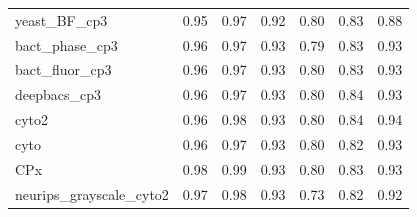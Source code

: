 \documentclass[./dissertation.tex]{subfiles}
\begin{document}
\begin{table}[htbp]
\begin{tabular}{|l|c|c|c|c|c|c|}
        yeast\_BF\_cp3            & 0.95                                    & 0.97                                        & 0.92                                    & 0.80                                  & 0.83                                   & 0.88                                    \\
        bact\_phase\_cp3          & 0.96                                    & 0.97                                        & 0.93                                    & 0.79                                  & 0.83                                   & 0.93                                    \\
        bact\_fluor\_cp3          & 0.96                                    & 0.97                                        & 0.93                                    & 0.80                                  & 0.83                                   & 0.93                                    \\
        deepbacs\_cp3             & 0.96                                    & 0.97                                        & 0.93                                    & 0.80                                  & 0.84                                   & 0.93                                    \\
        cyto2                     & 0.96                                    & 0.98                                        & 0.93                                    & 0.80                                  & 0.84                                   & 0.94                                    \\
        cyto                      & 0.96                                    & 0.97                                        & 0.93                                    & 0.80                                  & 0.82                                   & 0.93                                    \\
        CPx                       & 0.98                                    & 0.99                                        & 0.93                                    & 0.80                                  & 0.83                                   & 0.93                                    \\
        neurips\_grayscale\_cyto2 & 0.97                                    & 0.98                                        & 0.93                                    & 0.73                                  & 0.82                                   & 0.92                                    \\

\end{tabular}
\end{table}
\end{document}
